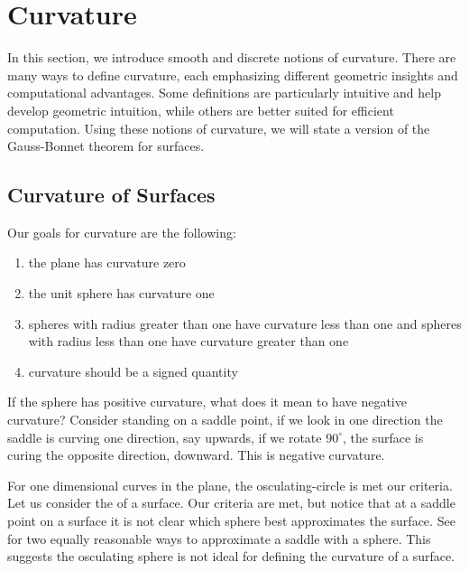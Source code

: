 \section{Curvature}
\label{sec:curvature}

In this section, we introduce smooth and discrete notions of curvature. 
There are many ways to define curvature, each emphasizing different geometric insights and computational advantages. 
Some definitions are particularly intuitive and help develop geometric intuition, while others are better suited for efficient computation. 
Using these notions of curvature, we will state a version of the Gauss-Bonnet theorem for surfaces.



\subsection{Curvature of Surfaces}

Our goals for curvature are the following:
\begin{enumerate}
\item the plane has curvature zero
\item the unit sphere has curvature one
\item spheres with radius greater than one have curvature less than one and
spheres with radius less than one have curvature greater than one
\item curvature should be a signed quantity
\end{enumerate}

If the sphere has positive curvature, what does it mean to have negative curvature?
Consider standing on a saddle point, if we look in one direction the saddle is curving
one direction, say upwards, if we rotate $90^\circ$, the surface is curing the opposite direction, downward.  This is negative curvature.


For one dimensional curves in the plane, the osculating-circle is
met our criteria.
 Let us consider the  of a surface.
 Our criteria are met,
 but notice that at a saddle point on a surface it is not clear which sphere
best approximates the surface. See  for two
equally reasonable ways to approximate a saddle with a sphere.
This suggests the osculating sphere is not ideal for defining the curvature
of a surface.

